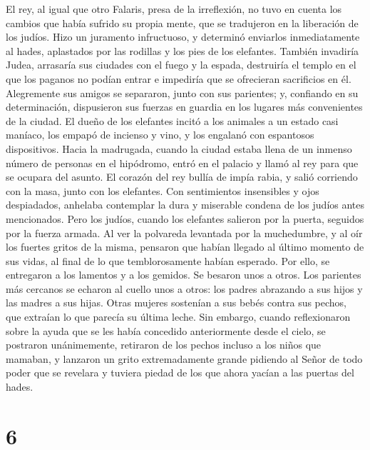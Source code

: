  El rey, al igual que otro Falaris, presa de la
irreflexión, no tuvo en cuenta los cambios que había sufrido su propia
mente, que se tradujeron en la liberación de los judíos. Hizo un
juramento infructuoso, y determinó enviarlos inmediatamente al hades,
aplastados por las rodillas y los pies de los elefantes. 
También invadiría Judea, arrasaría sus ciudades con el fuego y la
espada, destruiría el templo en el que los paganos no podían entrar e
impediría que se ofrecieran sacrificios en él. 
Alegremente sus amigos se separaron, junto con sus parientes; y,
confiando en su determinación, dispusieron sus fuerzas en guardia en los
lugares más convenientes de la ciudad.  El dueño de los
elefantes incitó a los animales a un estado casi maníaco, los empapó de
incienso y vino, y los engalanó con espantosos dispositivos.
 Hacia la madrugada, cuando la ciudad estaba llena de un
inmenso número de personas en el hipódromo, entró en el palacio y llamó
al rey para que se ocupara del asunto.  El corazón del
rey bullía de impía rabia, y salió corriendo con la masa, junto con los
elefantes. Con sentimientos insensibles y ojos despiadados, anhelaba
contemplar la dura y miserable condena de los judíos antes mencionados.
 Pero los judíos, cuando los elefantes salieron por la
puerta, seguidos por la fuerza armada. Al ver la polvareda levantada por
la muchedumbre, y al oír los fuertes gritos de la misma, 
pensaron que habían llegado al último momento de sus vidas, al final de
lo que temblorosamente habían esperado. Por ello, se entregaron a los
lamentos y a los gemidos. Se besaron unos a otros. Los parientes más
cercanos se echaron al cuello unos a otros: los padres abrazando a sus
hijos y las madres a sus hijas. Otras mujeres sostenían a sus bebés
contra sus pechos, que extraían lo que parecía su última leche.
 Sin embargo, cuando reflexionaron sobre la ayuda que se
les había concedido anteriormente desde el cielo, se postraron
unánimemente, retiraron de los pechos incluso a los niños que mamaban, y
 lanzaron un grito extremadamente grande pidiendo al
Señor de todo poder que se revelara y tuviera piedad de los que ahora
yacían a las puertas del hades.

\hypertarget{section-5}{%
\section{6}\label{section-5}}

